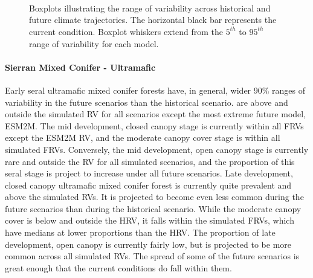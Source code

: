 \begin{figure}[htbp]
  \centering
  \qquad
   \\
  \qquad
   \\
       \\
  \qquad
    \qquad
    \caption{Boxplots illustrating the range of variability across historical and future climate trajectories. The horizontal black bar represents the current condition. Boxplot whiskers extend from the $5^{th}$ to $95^{th}$ range of variability for each model. }
  \label{fig:covcond_megx} 
\end{figure} %


\paragraph{Sierran Mixed Conifer - Ultramafic} Early seral ultramafic mixed conifer forests have, in general, wider 90\% ranges of variability in the future scenarios than the historical scenario. are above and outside the simulated RV for all scenarios except the most extreme future model, ESM2M. The mid development, closed canopy stage is currently within all FRVs except the ESM2M RV, and the moderate canopy cover stage is within all simulated FRVs. Conversely, the mid development, open canopy stage is currently rare and outside the RV for all simulated scenarios, and the proportion of this seral stage is project to increase under all future scenarios. Late development, closed canopy ultramafic mixed conifer forest is currently quite prevalent and above the simulated RVs. It is projected to become even less common during the future scenarios than during the historical scenario. While the moderate canopy cover is below and outside the HRV, it falls within the simulated FRVs, which have medians at lower proportions than the HRV. The proportion of late development, open canopy is currently fairly low, but is projected to be more common across all simulated RVs. The spread of some of the future scenarios is great enough that the current conditions do fall within them. 

